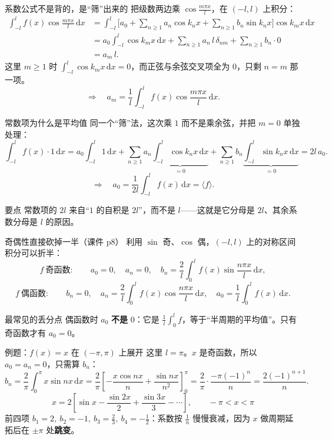 \documentclass[aspectratio=169,10pt]{beamer}
\newcommand{\bhl}[1]{{\color{mid}\bfseries #1}}
\begin{document}
\begin{frame}{系数公式不是背的，是“筛”出来的}
  {\small 把级数两边乘 $\cos\frac{m\pi x}{l}$，在 $(-l,l)$ 上积分：}
  \begin{align*}
    \int_{-l}^{l}f(x)\cos\frac{m\pi x}{l}\,\mathrm{d}x
    &=\int_{-l}^{l}\Big[a_0+\sum_{n\ge1}a_n\cos k_nx+\sum_{n\ge1}b_n\sin k_nx\Big]\cos k_mx\,\mathrm{d}x\\
    &=a_0\int_{-l}^{l}\cos k_mx\,\mathrm{d}x
      +\sum_{n\ge1}a_n\,l\,\delta_{nm}
      +\sum_{n\ge1}b_n\cdot 0\\
    &=a_m\,l .
  \end{align*}
  {\small 这里 $m\ge1$ 时 $\int_{-l}^{l}\cos k_mx\,\mathrm{d}x=0$，而正弦与余弦交叉项全为 0，只剩 $n=m$ 那一项。}
  \[
    \Longrightarrow\quad a_m=\frac{1}{l}\int_{-l}^{l}f(x)\cos\frac{m\pi x}{l}\,\mathrm{d}x .
  \]
\end{frame}

\begin{frame}{常数项为什么是平均值}
  {\small 同一个“筛”法，这次乘 $1$ 而不是乘余弦，并把 $m=0$ 单独处理：}
  \[
    \int_{-l}^{l}f(x)\cdot1\,\mathrm{d}x
    =a_0\int_{-l}^{l}1\,\mathrm{d}x+\sum_{n\ge1}a_n\underbrace{\int_{-l}^{l}\cos k_nx\,\mathrm{d}x}_{=0}
    +\sum_{n\ge1}b_n\underbrace{\int_{-l}^{l}\sin k_nx\,\mathrm{d}x}_{=0}
    =2l\,a_0 .
  \]
  \[
    \Longrightarrow\quad a_0=\frac{1}{2l}\int_{-l}^{l}f(x)\,\mathrm{d}x=\langle f\rangle .
  \]
  \begin{block}{要点}
    \small 常数项的 $2l$ 来自“$1$ 的自积是 $2l$”，而不是 $l$——这就是它分母是 $2l$、其余系数分母是 $l$ 的原因。
  \end{block}
\end{frame}

\begin{frame}{奇偶性直接砍掉一半（课件 p8）}
  {\small 利用 $\sin$ 奇、$\cos$ 偶，$(-l,l)$ 上的对称区间积分可以折半：}
  \[
    f\ \text{奇函数}:\qquad a_0=0,\quad a_n=0,\quad
    b_n=\frac{2}{l}\int_{0}^{l}f(x)\sin\frac{n\pi x}{l}\,\mathrm{d}x,
  \]
  \[
    f\ \text{偶函数}:\qquad b_n=0,\quad
    a_n=\frac{2}{l}\int_{0}^{l}f(x)\cos\frac{n\pi x}{l}\,\mathrm{d}x,\quad
    a_0=\frac{1}{l}\int_{0}^{l}f(x)\,\mathrm{d}x .
  \]
  \begin{block}{最常见的丢分点}
    \small 偶函数时 $a_0$ \bhl{不是} $0$：它是 $\frac{1}{l}\int_0^l f$，等于“半周期的平均值”。只有奇函数才有 $a_0=0$。
  \end{block}
\end{frame}

\begin{frame}{例题：$f(x)=x$ 在 $(-\pi,\pi)$ 上展开}
  {\small 这里 $l=\pi$。$x$ 是奇函数，所以 $a_0=a_n=0$，只需算 $b_n$：}
  \[
    b_n=\frac{2}{\pi}\int_{0}^{\pi}x\sin nx\,\mathrm{d}x
    =\frac{2}{\pi}\left[-\frac{x\cos nx}{n}+\frac{\sin nx}{n^{2}}\right]_{0}^{\pi}
    =\frac{2}{\pi}\cdot\frac{-\pi(-1)^{n}}{n}
    =\frac{2(-1)^{n+1}}{n}.
  \]
  \[
    \boxed{\;x=2\left[\sin x-\frac{\sin 2x}{2}+\frac{\sin 3x}{3}-\cdots\right],\qquad -\pi<x<\pi\;}
  \]
  {\small 前四项 $b_1=2,\ b_2=-1,\ b_3=\frac{2}{3},\ b_4=-\frac{1}{2}$：系数按 $\frac{1}{n}$ 慢慢衰减，因为 $x$ 做周期延拓后在 $\pm\pi$ 处\bhl{跳变}。}
\end{frame}
\end{document}
